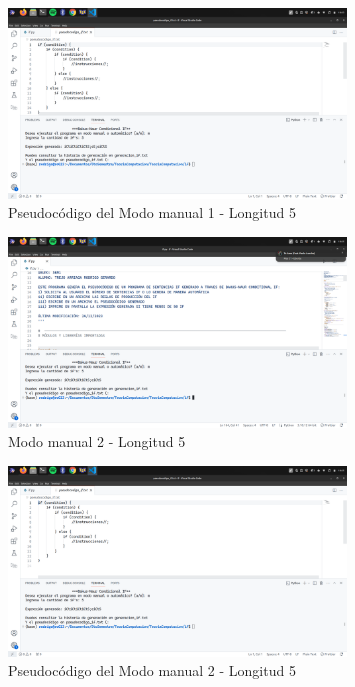 \documentclass[11pt]{article} %
\begin{document}
	\begin{figure}[h]
		\centering
		\includegraphics[width=0.8\textwidth]{manual1,2}
		\caption{Pseudocódigo del Modo manual 1 - Longitud 5}
	\end{figure}
	

	
	\newpage
	
	\begin{figure}[h]
		\centering
		\includegraphics[width=0.8\textwidth]{manual2.png}
		\caption{Modo manual 2 - Longitud 5}
	\end{figure}
	
	\begin{figure}[h]
		\centering
		\includegraphics[width=0.8\textwidth]{arch2,1}
		\caption{Pseudocódigo del Modo manual 2 - Longitud 5}
	\end{figure}
	
\end{document}
